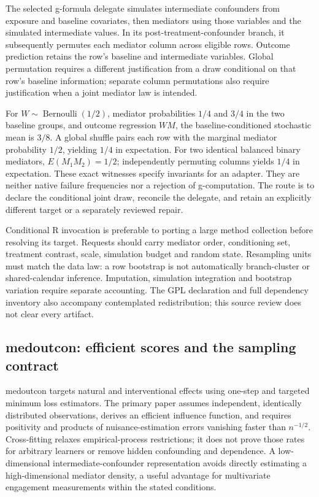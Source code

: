 The selected g-formula delegate simulates intermediate confounders from
exposure and baseline covariates, then mediators using those variables and the
simulated intermediate values. In its post-treatment-confounder branch, it
subsequently permutes each mediator column across eligible rows. Outcome
prediction retains the row's baseline and intermediate variables. Global
permutation requires a different justification from a draw conditional on that
row's baseline information; separate column permutations also require
justification when a joint mediator law is intended. \citep{exec25_rmed_cmaverse}

For $W\sim\operatorname{Bernoulli}(1/2)$, mediator probabilities $1/4$ and
$3/4$ in the two baseline groups, and outcome regression $WM$, the
baseline-conditioned stochastic mean is $3/8$. A global shuffle pairs each
row with the marginal mediator probability $1/2$, yielding $1/4$ in expectation.
For two identical balanced binary mediators, $E(M_1M_2)=1/2$; independently
permuting columns yields $1/4$ in expectation. These exact witnesses specify
invariants for an adapter. They are neither native failure frequencies nor a
rejection of g-computation. The route is to declare the conditional joint draw,
reconcile the delegate, and retain an explicitly different target or a separately
reviewed repair. \citep{exec25_rmed_choice}

Conditional R invocation is preferable to porting a large method collection
before resolving its target. Requests should carry mediator order, conditioning
set, treatment contrast, scale, simulation budget and random state. Resampling
units must match the data law: a row bootstrap is not automatically branch-cluster
or shared-calendar inference. Imputation, simulation integration and bootstrap
variation require separate accounting. The GPL declaration and full dependency
inventory also accompany contemplated redistribution; this source review does
not clear every artifact. \citep{exec25_rmed_cmaverse,exec25_rmed_choice}

\subsection{medoutcon: efficient scores and the sampling contract}

medoutcon targets natural and interventional effects using one-step and targeted
minimum loss estimators. The primary paper assumes independent, identically
distributed observations, derives an efficient influence function, and requires
positivity and products of nuisance-estimation errors vanishing faster than
$n^{-1/2}$. Cross-fitting relaxes empirical-process restrictions; it does not
prove those rates for arbitrary learners or remove hidden confounding and
dependence. A low-dimensional intermediate-confounder representation avoids
directly estimating a high-dimensional mediator density, a useful advantage
for multivariate engagement measurements within the stated conditions.
\citep{exec25_rmed_diaz_paper}

